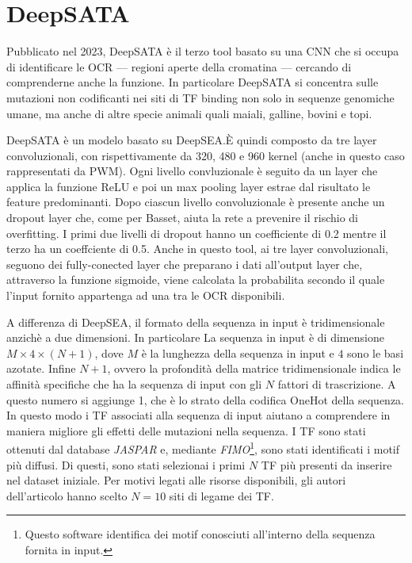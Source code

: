 \section{DeepSATA}\label{sec:DeepSATA}
% 
Pubblicato nel 2023, DeepSATA è il terzo tool basato su una \acs{CNN} che si occupa di identificare le \acs{OCR} — regioni aperte della cromatina — cercando di comprenderne anche la funzione. In particolare DeepSATA si concentra sulle mutazioni non codificanti nei siti di \acs{TF} binding non solo in sequenze genomiche umane, ma anche di altre specie animali quali maiali, galline, bovini e topi.

DeepSATA è un modelo basato su DeepSEA.\@ È quindi composto da tre layer convoluzionali, con rispettivamente da 320, 480 e 960 kernel (anche in questo caso rappresentati da \acs{PWM}). Ogni livello convluzionale è seguito da un layer che applica la funzione \acs{ReLU} e poi un max pooling layer estrae dal risultato le feature predominanti. Dopo ciascun livello convoluzionale è presente anche un dropout layer che, come per Basset, aiuta la rete a prevenire il rischio di overfitting. I primi due livelli di dropout hanno un coefficiente di 0.2 mentre il terzo ha un coeffciente di 0.5. Anche in questo tool, ai tre layer convoluzionali, seguono dei fully-conected layer che preparano i dati all'output layer che, attraverso la funzione sigmoide, viene calcolata la probabilita secondo il quale l'input fornito appartenga ad una tra le \acs{OCR} disponibili.

A differenza di DeepSEA, il formato della sequenza in input è tridimensionale anzichè a due dimensioni. In particolare La sequenza in input è di dimensione $M \times 4 \times (N + 1)$, dove $M$ è la lunghezza della sequenza in input e $4$ sono le basi azotate. Infine $N + 1$, ovvero la profondità della matrice tridimensionale indica le affinità specifiche che ha la sequenza di input con gli $N$ fattori di trascrizione. A questo numero si aggiunge 1, che è lo strato della codifica OneHot della sequenza. In questo modo i \acs{TF} associati alla sequenza di input aiutano a comprendere in maniera migliore gli effetti delle mutazioni nella sequenza. I \acs{TF} sono stati ottenuti dal database \textsl{JASPAR} e, mediante \textsl{FIMO}\footnote{Questo software identifica dei motif conosciuti all'interno della sequenza fornita in input.}, sono stati identificati i motif più diffusi. Di questi, sono stati selezionai i primi $N$ \acs{TF} più presenti da inserire nel dataset iniziale. Per motivi legati alle risorse disponibili, gli autori dell'articolo hanno scelto $N=10$ siti di legame dei \acs{TF}. 

